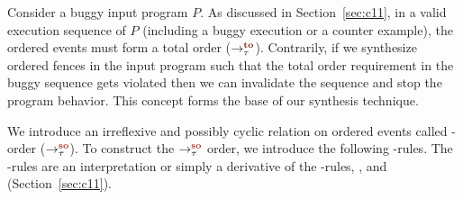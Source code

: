 Consider a buggy input program $P$.
%
As discussed in Section~\ref{sec:c11}, in a valid \cc execution 
sequence of $P$ (including a buggy execution or a counter example), 
the \sc ordered events must form a total order ($\setTO$).
%
Contrarily, if we synthesize \sc ordered fences in the input program 
such that the total order requirement in the buggy sequence gets violated 
then we can invalidate the sequence and stop the program behavior.
This concept forms the base of our synthesis technique.

We introduce an irreflexive and possibly cyclic relation
on \sc ordered events called \sc-order ($\setSO$).
%
To construct the $\setSO$ order, we introduce the following \lso-rules.
The \lso-rules are an interpretation or simply a derivative of the 
\lto-rules, ,  and  
(Section~\ref{sec:c11}).

